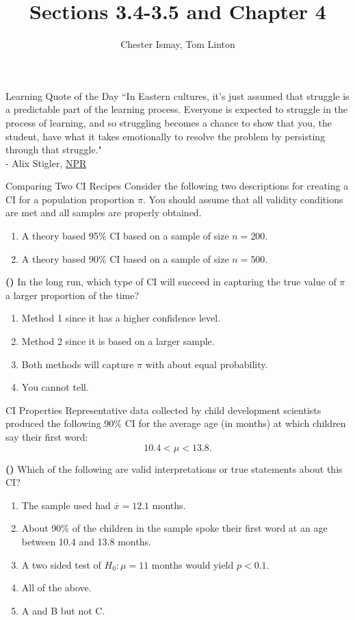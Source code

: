 \documentclass[13pt]{beamer}
\title{Sections 3.4-3.5 and Chapter 4}
\author{Chester Ismay, Tom Linton}
\institute{Ripon College, Central College}
\date{}
\newcounter{count}
\newcommand{\quotes}[2]{\centering \Large{``#1"\\
\vspace*{0.2in}
\hspace*{0.5in} - #2}}
\newcommand{\question}{ \textbf{(\decimal{count})} \stepcounter{count}}
\begin{document}
\begin{frame}
  \titlepage
\end{frame}


\begin{frame}{Learning Quote of the Day}
\quotes{In Eastern cultures, it's just assumed that struggle is a predictable part of the learning process. Everyone is expected to struggle in the process of learning, and so struggling becomes a chance to show that you, the student, have what it takes emotionally to resolve the problem by persisting through that struggle.}{Alix Stigler, \href{http://www.npr.org/blogs/health/2012/11/12/164793058/struggle-for-smarts-how-eastern-and-western-cultures-tackle-learning}{NPR}}
\end{frame}

\begin{frame}{Comparing Two CI Recipes}
Consider the following two descriptions for creating a CI for a population proportion $\pi$. You should assume that all validity conditions are met and all samples are properly obtained.
\begin{enumerate}
   \item A theory based 95\% CI based on a sample of size $n = 200$.
   \item A theory based 90\% CI based on a sample of size $n=500$.
\end{enumerate}

\question In the long run, which type of CI will succeed in capturing the true value of $\pi$ a larger proportion of the time?

\begin{enumerate}[A]
   \item Method 1 since it has a higher confidence level.%
   \item Method 2 since it is based on a larger sample.
   \item Both methods will capture $\pi$ with about equal probability.
   \item You cannot tell.
\end{enumerate}
\end{frame}

\begin{frame}{CI Properties}
Representative data collected by child development scientists produced the following 90\% CI for the average age (in months) at which children say their first word:
$$10.4 < \mu < 13.8.$$

\question Which of the following are valid interpretations or true statements about this CI?

\begin{enumerate}[A]
   \item The sample used had $\overline{x} = 12.1$ months.%
   \item About 90\% of the children in the sample spoke their first word at an age between 10.4 and 13.8 months.
   \item A two sided test of $H_0: \mu = 11$ months would yield $p<0.1$.
   \item All of the above.
   \item A and B but not C.
\end{enumerate}
\end{frame}
\end{document}
